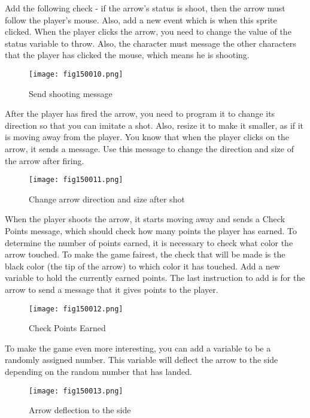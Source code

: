 Add the following check - if the arrow's status is shoot, then the arrow must follow the player's mouse. Also, add a new event which is when this sprite clicked. When the player clicks the arrow, you need to change the value of the status variable to throw. Also, the character must message the other characters that the player has clicked the mouse, which means he is shooting.

\begin{figure}[H]
   \centering
   \texttt{[image: fig150010.png]}
   \caption{Send shooting message}
\label{fig150010}
\end{figure}

After the player has fired the arrow, you need to program it to change its direction so that you can imitate a shot. Also, resize it to make it smaller, as if it is moving away from the player. You know that when the player clicks on the arrow, it sends a message. Use this message to change the direction and size of the arrow after firing.

\begin{figure}[H]
   \centering
   \texttt{[image: fig150011.png]}
   \caption{Change arrow direction and size after shot}
\label{fig150011}
\end{figure}

When the player shoots the arrow, it starts moving away and sends a Check Points message, which should check how many points the player has earned. To determine the number of points earned, it is necessary to check what color the arrow touched. To make the game fairest, the check that will be made is the black color (the tip of the arrow) to which color it has touched. Add a new variable to hold the currently earned points. The last instruction to add is for the arrow to send a message that it gives points to the player.

\begin{figure}[H]
   \centering
   \texttt{[image: fig150012.png]}
   \caption{Check Points Earned}
\label{fig150012}
\end{figure}

To make the game even more interesting, you can add a variable to be a randomly assigned number. This variable will deflect the arrow to the side depending on the random number that has landed.

\begin{figure}[H]
   \centering
   \texttt{[image: fig150013.png]}
   \caption{Arrow deflection to the side}
\label{fig150013}
\end{figure}

